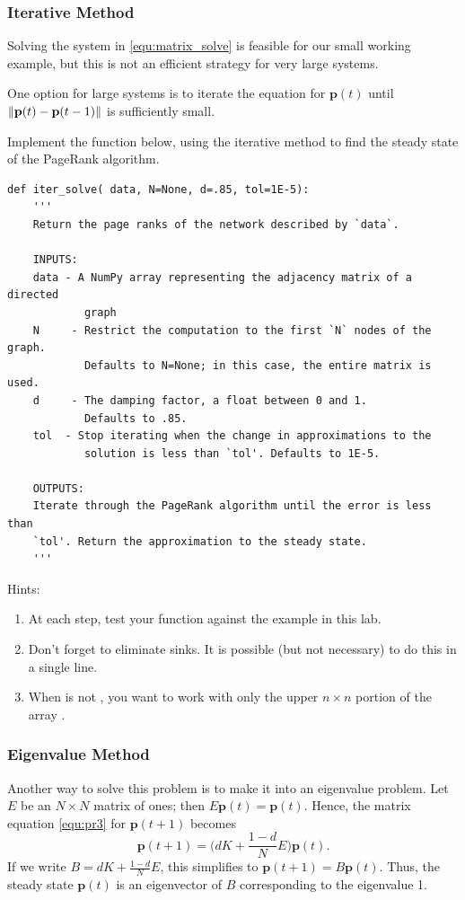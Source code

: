 \subsubsection*{Iterative Method}
Solving the system in \eqref{equ:matrix_solve} is feasible for our small working example, but this is not an efficient strategy for very large systems.

One option for large systems is to iterate the equation for $\mathbf{p}(t)$ until $\left\lVert\mathbf{p}(t)-\mathbf{p}(t-1)\right\rVert$ is sufficiently small.


\begin{problem}
\label{prob:pagerank_dense_iter}
Implement the function below, using the iterative method to find the steady state of the PageRank algorithm.
\begin{lstlisting}
def iter_solve( data, N=None, d=.85, tol=1E-5):
    '''
    Return the page ranks of the network described by `data`.
    
    INPUTS:
    data - A NumPy array representing the adjacency matrix of a directed 
            graph
    N     - Restrict the computation to the first `N` nodes of the graph. 
            Defaults to N=None; in this case, the entire matrix is used.
    d     - The damping factor, a float between 0 and 1. 
            Defaults to .85.
    tol  - Stop iterating when the change in approximations to the 
            solution is less than `tol'. Defaults to 1E-5.
    
    OUTPUTS:
    Iterate through the PageRank algorithm until the error is less than 
    `tol'. Return the approximation to the steady state.
    '''
\end{lstlisting}
Hints:
\begin{enumerate}
\item At each step, test your function against the example in this lab.
\item Don't forget to eliminate sinks. 
It is possible (but not necessary) to do this in a single line.
\item When  is not , you want to work with only the upper $n \times n$ portion of the array .
\end{enumerate}
\end{problem}

\subsubsection*{Eigenvalue Method}
Another way to solve this problem is to make it into an eigenvalue problem. 
Let $E$ be an $N \times N$ matrix of ones; then $E\mathbf{p}(t) = \mathbf{p}(t)$. 
Hence, the matrix equation \eqref{equ:pr3} for $\mathbf{p}(t+1)$ becomes
\[\mathbf{p}(t+1) = \Big(dK + \frac{1-d}{N}E\Big)\mathbf{p}(t).\]
If we write $B = dK + \frac{1-d}{N}E$, this simplifies to $\mathbf{p}(t+1) = B\mathbf{p}(t).$
Thus, the steady state $\mathbf{p}(t)$ is an eigenvector of $B$ corresponding to the eigenvalue 1.

